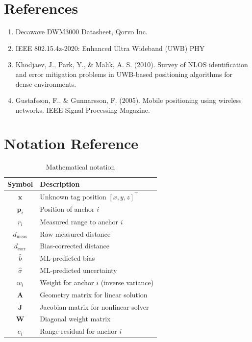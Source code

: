 \documentclass[11pt,a4paper]{article}
\begin{document}
\section{References}

\begin{enumerate}
    \item Decawave DWM3000 Datasheet, Qorvo Inc.
    \item IEEE 802.15.4z-2020: Enhanced Ultra Wideband (UWB) PHY
    \item Khodjaev, J., Park, Y., \& Malik, A. S. (2010). Survey of NLOS identification and error mitigation problems in UWB-based positioning algorithms for dense environments.
    \item Gustafsson, F., \& Gunnarsson, F. (2005). Mobile positioning using wireless networks. IEEE Signal Processing Magazine.
\end{enumerate}

\appendix
\section{Notation Reference}

\begin{table}[H]
\centering
\begin{tabular}{@{}cl@{}}
\toprule
\textbf{Symbol} & \textbf{Description} \\
\midrule
$\mathbf{x}$ & Unknown tag position $[x, y, z]^\top$ \\
$\mathbf{p}_i$ & Position of anchor $i$ \\
$r_i$ & Measured range to anchor $i$ \\
$d_{\text{meas}}$ & Raw measured distance \\
$d_{\text{corr}}$ & Bias-corrected distance \\
$\hat{b}$ & ML-predicted bias \\
$\hat{\sigma}$ & ML-predicted uncertainty \\
$w_i$ & Weight for anchor $i$ (inverse variance) \\
$\mathbf{A}$ & Geometry matrix for linear solution \\
$\mathbf{J}$ & Jacobian matrix for nonlinear solver \\
$\mathbf{W}$ & Diagonal weight matrix \\
$e_i$ & Range residual for anchor $i$ \\
\bottomrule
\end{tabular}
\caption{Mathematical notation}
\end{table}
\end{document}
